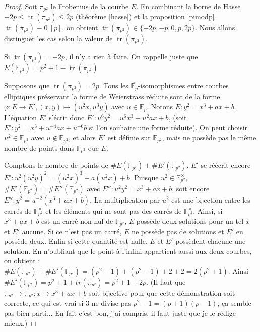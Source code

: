 \documentclass{article}
\theoremstyle{plain}%
\theoremstyle{definition}%
\newcommand{\F}{\mathbb{F}}
\DeclareMathOperator{\tr}{tr}
\begin{document}
\begin{proof}
  Soit $\pi_{p^2}$ le Frobenius de la courbe $E$. En combinant la borne de Hasse $-2p \le \tr(\pi_{p^2}) \le 2p$ (théorème \ref{hasse}) et la proposition \ref{pimodp} $\tr(\pi_{p^2}) \equiv 0\ [p]$, on obtient $\tr(\pi_{p^2}) \in \{-2p, -p, 0, p, 2p\}$.  Nous allons distinguer les cas selon la valeur de $\tr(\pi_{p^2})$.
   
  \vspace{1em}
  Si $\tr(\pi_{p^2}) = -2p$, il n'y a rien à faire. On rappelle juste que $E(\F_{p^2}) = p^2 + 1 - \tr(\pi_{p^2})$ 
    
  \vspace{1em}
  Supposons que $\tr(\pi_{p^2}) = 2p$. Tous les $\overline{\F_p}$-isomorphismes entre courbes elliptiques préservant la forme de Weierstrass réduite sont de la forme 
      $\varphi : E \to E', (x, y) \mapsto (u^2 x, u^3 y)$ avec $u\in\overline{\F_p}$. Notons $E : y^2 = x^3 + ax +b$. L'équation $E'$ s'écrit donc $E' : u^6 y^2 = u^6 x^3 + u^2 a x + b$, (soit $E' : y^2 = x^3 + u^{-4} a x + u^{-6}b$ si l'on souhaite une forme réduite). On peut choisir $u^2\in\F_{p^2}$ avec $u\notin \F_{p^2}$, et alors $E'$ est définie sur $\F_{p^2}$, mais ne possède pas le même nombre de points dans $\F_{p^2}$ que $E$.

      Comptons le nombre de points de $\#E(\F_{p^2}) + \#E'(\F_{p^2})$. $E'$ se réécrit encore $E' : u^2 (u^2 y)^2 = (u^2 x)^3 + a (u^2 x) + b$. Puisque $u^2\in \F_{p^2}^\times$, $\#E'(\F_{p^2}) = \#E''(\F_{p^2})$ avec $E'' : u^2 y^2 = x^3 + a x + b$, soit encore $E'' : y^2 = u^{-2} (x^3 + ax + b)$.
      La multiplication par $u^2$ est une bijection entre les carrés de $\F_{p^2}^\times$ et les éléments qui ne sont pas des carrés de $\F_{p^2}^\times$. 
      Ainsi, si $x^3 + ax + b$ est un carré non nul de $\F_{p^2}$, $E$ possède deux solutions pour un tel $x$ et $E'$ aucune. Si ce n'est pas un carré, $E$ ne possède pas de solutions et $E'$ en possède deux. Enfin si cette quantité est nulle, $E$ et $E'$ possèdent chacune une solution. En n'oubliant que le point à l'infini appartient aussi aux deux courbes, on obtient :
      $ \#E(\F_{p^2}) + \#E'(\F_{p^2}) = (p^2 - 1) + (p^2 -1) + 2 + 2 = 2(p^2 + 1)$. Ainsi $\#E'(\F_{p^2}) = p^2 + 1 + tr(\pi_{p^2}) = p^2 + 1 + 2p$. 
      {\color{red} (Il faut que $\F_{p^2} \to \F_{p^2} : x \mapsto x^3 + ax +b$ soit bijective pour que cette démonstration soit correcte, ce qui est vrai si $3$ ne divise pas $p^2 - 1=(p+1)(p-1)$, ça semble pas bien parti... En fait c'est bon, j'ai compris, il faut juste que je le rédige mieux.)}


\end{proof}
\end{document}
